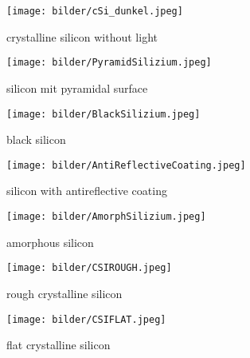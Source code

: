 \begin{figure}[h]
	\centering
	\texttt{[image: bilder/cSi\_dunkel.jpeg]}
	\caption{crystalline silicon without light}
	\label{fig:csi_dunkel}
\end{figure}

\begin{figure}[h]
	\centering
	\texttt{[image: bilder/PyramidSilizium.jpeg]}
	\caption{silicon mit pyramidal surface}
	\label{fig:pyramidsilizium}
\end{figure}

\begin{figure}[h]
	\centering
	\texttt{[image: bilder/BlackSilizium.jpeg]}
	\caption{black silicon}
	\label{fig:blacksilizium}
\end{figure}

\begin{figure}[h]
	\centering
	\texttt{[image: bilder/AntiReflectiveCoating.jpeg]}
	\caption{silicon with antireflective coating}
	\label{fig:antireflectivecoating}
\end{figure}

\begin{figure}[h]
	\centering
	\texttt{[image: bilder/AmorphSilizium.jpeg]}
	\caption{amorphous silicon}
	\label{fig:amorphsilizium}
\end{figure}

\begin{figure}[h]
	\centering
	\texttt{[image: bilder/CSIROUGH.jpeg]}
	\caption{rough crystalline silicon}
	\label{fig:csirough}
\end{figure}

\begin{figure}[h]
	\centering
	\texttt{[image: bilder/CSIFLAT.jpeg]}
	\caption{flat crystalline silicon}
	\label{fig:csiflat}
\end{figure}








